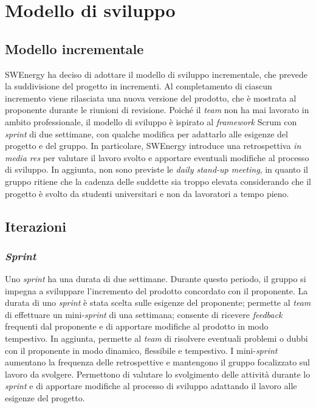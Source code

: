 \section{Modello di sviluppo}

\subsection{Modello incrementale}
SWEnergy ha deciso di adottare il modello di sviluppo incrementale, che prevede
la suddivisione del progetto in incrementi. Al completamento di ciascun
incremento viene rilasciata una nuova versione del prodotto, che è mostrata al
proponente durante le riunioni di revisione. Poiché il \textit{team} non ha mai
lavorato in ambito professionale, il modello di sviluppo è ispirato al
\textit{framework} Scrum con \textit{sprint} di due settimane, con qualche
modifica per adattarlo alle esigenze del progetto e del gruppo. In particolare,
SWEnergy introduce una retrospettiva \textit{in media res} per valutare il
lavoro svolto e apportare eventuali modifiche al processo di sviluppo.
In aggiunta, non sono previste le \textit{daily stand-up meeting}, in quanto il
gruppo ritiene che la cadenza delle suddette sia troppo elevata considerando
che il progetto è svolto da studenti universitari e non da lavoratori a tempo
pieno.

\subsection{Iterazioni}

\subsubsection{\textit{Sprint}}
Uno \textit{sprint} ha una durata di due settimane. Durante questo periodo, il
gruppo si impegna a sviluppare l'incremento del prodotto concordato con il
proponente. La durata di uno \textit{sprint} è stata scelta sulle esigenze del
proponente;
permette al \textit{team} di effettuare un mini-\textit{sprint} di una
settimana; consente di ricevere \textit{feedback} frequenti dal proponente e di
apportare modifiche al prodotto in modo tempestivo. In aggiunta, permette al
\textit{team} di risolvere eventuali problemi o dubbi con il proponente in modo
dinamico, flessibile e tempestivo. I mini-\textit{sprint} aumentano la frequenza
delle retrospettive e mantengono il gruppo focalizzato sul lavoro da svolgere.
Permettono di valutare lo svolgimento delle attività durante lo \textit{sprint}
e di apportare modifiche al processo di sviluppo adattando il lavoro alle
esigenze del progetto.


